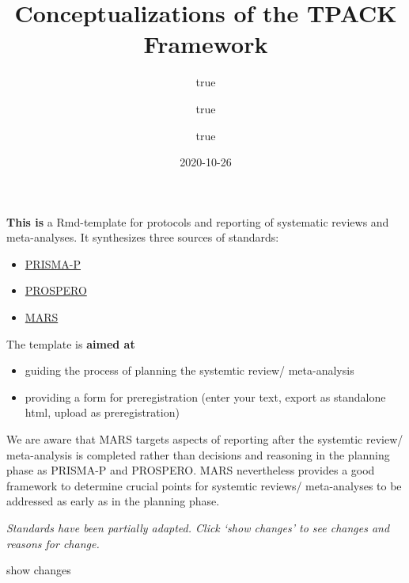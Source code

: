 \documentclass[
]{article}
\title{Conceptualizations of the TPACK Framework}
\author{true \and true \and true}
\date{2020-10-26}
\providecommand{\tightlist}{%
  \setlength{\itemsep}{0pt}\setlength{\parskip}{0pt}}
\begin{document}
\maketitle

{
\setcounter{tocdepth}{2}
\tableofcontents
}
\textbf{This is} a Rmd-template for protocols and reporting of
systematic reviews and meta-analyses. It synthesizes three sources of
standards:

\begin{itemize}
\tightlist
\item
  \href{https://doi.org/10.1136/bmj.i4086}{PRISMA-P}
\item
  \href{https://www.crd.york.ac.uk/prospero/}{PROSPERO}
\item
  \href{https://doi.org/10.1037/amp0000389}{MARS}
\end{itemize}

The template is \textbf{aimed at}

\begin{itemize}
\tightlist
\item
  guiding the process of planning the systemtic review/ meta-analysis
\item
  providing a form for preregistration (enter your text, export as
  standalone html, upload as preregistration)
\end{itemize}

We are aware that MARS targets aspects of reporting after the systemtic
review/ meta-analysis is completed rather than decisions and reasoning
in the planning phase as PRISMA-P and PROSPERO. MARS nevertheless
provides a good framework to determine crucial points for systemtic
reviews/ meta-analyses to be addressed as early as in the planning
phase.

\emph{Standards have been partially adapted. Click `show changes' to see
changes and reasons for change.}

show changes
\end{document}
